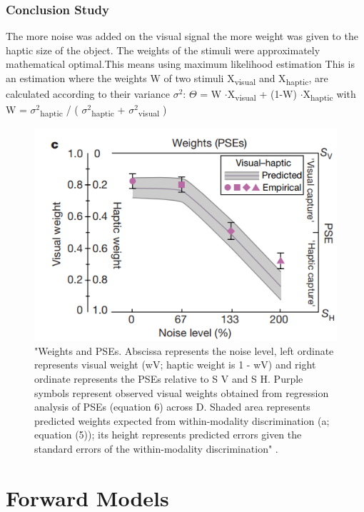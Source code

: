 \documentclass{SeminarV2}
\begin{document}
\subsubsection{Conclusion Study}
The more noise was added on the visual signal the more weight was given to the haptic size of the object. The weights of the stimuli were approximately mathematical optimal.This means using maximum likelihood estimation  This is an estimation where the weights W of two stimuli X\textsubscript{visual} and  X\textsubscript{haptic}, are calculated according to their variance $\sigma^2$: $\Theta$ = W $\cdot$X\textsubscript{visual} + (1-W) $\cdot$X\textsubscript{haptic} with  W = $\sigma^2$\textsubscript{haptic} / ( $\sigma^2$\textsubscript{haptic} + $\sigma^2$\textsubscript{visual} )

\begin{figure}
	\includegraphics[width=0.9\linewidth]{erns_con.png}
	
	
	\caption{"Weights and PSEs. Abscissa represents the noise level, left
		ordinate represents visual weight (wV; haptic weight is 1 - wV) and right ordinate
		represents the PSEs relative to S V and S H. Purple symbols represent observed visual
		weights obtained from regression analysis of PSEs (equation 6) across D. Shaded area
		represents predicted weights expected from within-modality discrimination (a; equation
		(5)); its height represents predicted errors given the standard errors of the within-modality
		discrimination" \cite{ernst2002humans}.}
	\label{fig:reuslts}
\end{figure}
\FloatBarrier
\section{Forward Models}
\end{document}
